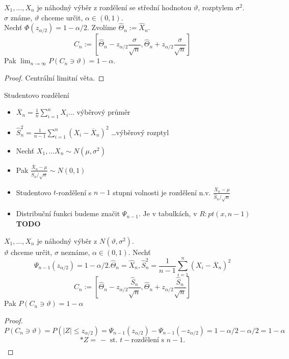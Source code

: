 \documentclass[../main.tex]{subfiles}
\begin{document}
\begin{theorem}
    $X_1,\dots,X_n$ je náhodný výběr z rozdělení se střední hodnotou $\vartheta$, rozptylem $\sigma^2$.\\
    $\sigma$ známe, $\vartheta$ chceme určit, $\alpha \in (0,1)$.\\
    Nechť $\Phi(z_{\alpha/2}) = 1 - \alpha / 2$. Zvolíme $\widehat{\Theta}_n := \widehat{X}_n$.
    \[C_n := [\widehat{\Theta}_n - z_{\alpha/2}\frac{\sigma}{\sqrt{n}}, \widehat{\Theta}_n + z_{\alpha/2}\frac{\sigma}{\sqrt{n}}]\]
    Pak $\lim_{n \rightarrow \infty} P(C_n \ni \vartheta) = 1 - \alpha$.
    \begin{proof}
        Centrální limitní věta.
    \end{proof}
\end{theorem}
\begin{definition}
    Studentovo rozdělení
    \begin{itemize}
        \item $\overline{X}_n = \frac{1}{n} \sum^n_{i=1} X_i \dots$ výběrový průměr
        \item $\widehat{S}^2_n = \frac{1}{n-1}\sum^n_{i=1} (X_i - \overline{X}_n)^2$ \dots výběrový rozptyl
    \end{itemize}
    \begin{itemize}
        \item Nechť $X_1, \dots X_n \sim N(\mu,\sigma^2)$
        \item Pak $\frac{\overline{X}_n - \mu}{\widehat{S}_n/\sqrt{n}} \sim N(0,1)$
        \item Studentovo $t$-rozdělení s $n-1$ stupni volnosti je rozdělení n.v. $\frac{\overline{X}_n - \mu}{\widehat{S}_n/\sqrt{n}}$
        \item Distribuční funkci budeme značit $\Psi_{n-1}$. Je v tabulkách, v $R:pt(x,n-1)$\textbf{TODO}
    \end{itemize}
\end{definition}
\begin{theorem}
    $X_1,\dots,X_n$ je náhodný výběr z $N(\vartheta,\sigma^2)$.\\
    $\vartheta$ chceme určit, $\sigma$ neznáme, $\alpha \in (0,1).$ Nechť
    \[\Psi_{n-1}(z_{\alpha/2}) = 1 - \alpha/2. \widehat{\Theta}_n = \widehat{X}_n, \widehat{S}^2_n = \frac{1}{n-1} \sum^n_{i=1} (X_i - \overline{X}_n)^2\]
    \[C_n := \left[\widehat{\Theta}_n - z_{\alpha/2} \frac{\widehat{S}_n}{\sqrt{n}}, \widehat{\Theta}_n + z_{\alpha/2}\frac{\widehat{S}_n}{\sqrt{n}}\right]\]
    Pak $P(C_n \ni \vartheta) = 1 - \alpha$
    \begin{proof}
        \[P(C_n \ni \vartheta) = P (|Z| \leq z_{\alpha/2}) = \Psi_{n-1}(z_{\alpha/2}) - \Psi_{n-1}(-z_{\alpha/2}) = 1 - \alpha/2 - \alpha/2 = 1-\alpha\]
        \[* Z = \frac{}{} - \text{ st. } t-\text{rozdělení s } n-1.\]
    \end{proof}
\end{theorem}
\end{document}
